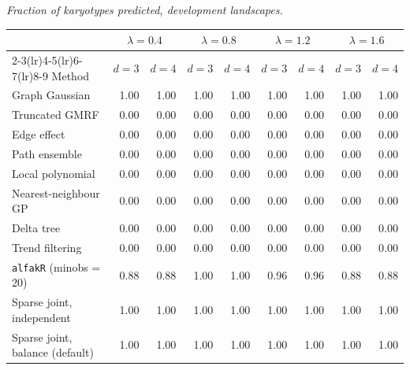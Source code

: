 \par\medskip\noindent\begin{minipage}{\linewidth}
\textit{Fraction of karyotypes predicted, development landscapes.}
\begin{center}
\footnotesize
\setlength{\tabcolsep}{3.5pt}
\begin{tabular}{l*{8}{r}}
\toprule
 & \multicolumn{2}{c}{$\lambda=0.4$} & \multicolumn{2}{c}{$\lambda=0.8$} & \multicolumn{2}{c}{$\lambda=1.2$} & \multicolumn{2}{c}{$\lambda=1.6$} \\
\cmidrule(lr){2-3}\cmidrule(lr){4-5}\cmidrule(lr){6-7}\cmidrule(lr){8-9}
Method & $d=3$ & $d=4$ & $d=3$ & $d=4$ & $d=3$ & $d=4$ & $d=3$ & $d=4$ \\
\midrule
Graph Gaussian & 1.00 & 1.00 & 1.00 & 1.00 & 1.00 & 1.00 & 1.00 & 1.00 \\
Truncated GMRF & 0.00 & 0.00 & 0.00 & 0.00 & 0.00 & 0.00 & 0.00 & 0.00 \\
Edge effect & 0.00 & 0.00 & 0.00 & 0.00 & 0.00 & 0.00 & 0.00 & 0.00 \\
Path ensemble & 0.00 & 0.00 & 0.00 & 0.00 & 0.00 & 0.00 & 0.00 & 0.00 \\
Local polynomial & 0.00 & 0.00 & 0.00 & 0.00 & 0.00 & 0.00 & 0.00 & 0.00 \\
Nearest-neighbour GP & 0.00 & 0.00 & 0.00 & 0.00 & 0.00 & 0.00 & 0.00 & 0.00 \\
Delta tree & 0.00 & 0.00 & 0.00 & 0.00 & 0.00 & 0.00 & 0.00 & 0.00 \\
Trend filtering & 0.00 & 0.00 & 0.00 & 0.00 & 0.00 & 0.00 & 0.00 & 0.00 \\
\texttt{alfakR} (minobs = 20) & 0.88 & 0.88 & 1.00 & 1.00 & 0.96 & 0.96 & 0.88 & 0.88 \\
Sparse joint, independent & 1.00 & 1.00 & 1.00 & 1.00 & 1.00 & 1.00 & 1.00 & 1.00 \\
Sparse joint, balance (default) & 1.00 & 1.00 & 1.00 & 1.00 & 1.00 & 1.00 & 1.00 & 1.00 \\
\bottomrule
\end{tabular}
\end{center}
\end{minipage}

